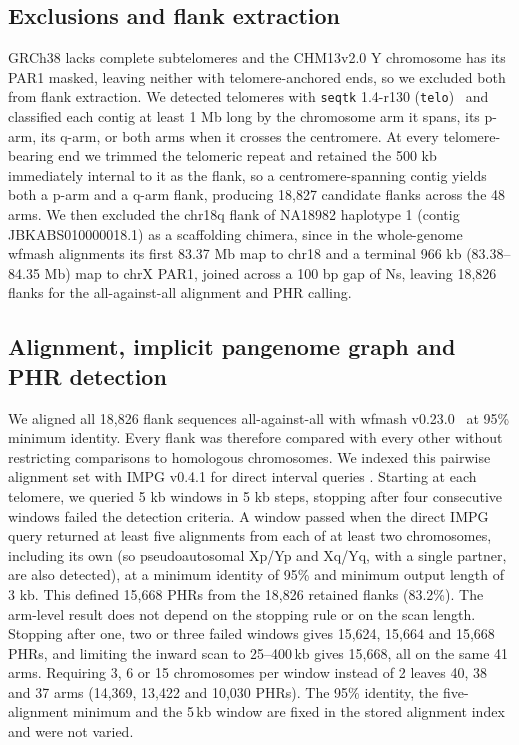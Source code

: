 \documentclass[pdflatex,mathphys]{jnl}
\begin{document}
\subsection*{Exclusions and flank extraction}

GRCh38 lacks complete subtelomeres and the CHM13v2.0 Y chromosome has its PAR1
masked, leaving neither with telomere-anchored ends, so we excluded both from
flank extraction. We detected telomeres with \texttt{seqtk} 1.4-r130
(\texttt{telo})~\cite{seqtk} and classified each contig at least 1 Mb long by the
chromosome arm it spans, its p-arm, its q-arm, or both arms when it crosses the
centromere. At every telomere-bearing end we trimmed the telomeric repeat and
retained the 500 kb immediately internal to it as the flank, so a
centromere-spanning contig yields both a p-arm and a q-arm flank, producing
18,827 candidate flanks across the 48 arms. We then excluded the chr18q flank of
NA18982 haplotype 1 (contig JBKABS010000018.1) as a scaffolding chimera, since in
the whole-genome wfmash alignments its first 83.37 Mb map to chr18 and a terminal
966 kb (83.38--84.35 Mb) map to chrX PAR1, joined across a 100 bp gap of Ns,
leaving 18,826 flanks for the all-against-all alignment and PHR calling.

\subsection*{Alignment, implicit pangenome graph and PHR detection}

We aligned all 18,826 flank sequences all-against-all with wfmash
v0.23.0~\cite{wfmash} at 95\% minimum identity. Every flank was therefore
compared with every other without restricting comparisons to homologous
chromosomes. We indexed this pairwise alignment set with IMPG v0.4.1 for direct
interval queries \cite{pangenome_graphs_impg_IMPG2023}. Starting at each
telomere, we queried 5 kb windows in 5 kb steps, stopping after four consecutive
windows failed the detection criteria. A window passed when the direct IMPG
query returned at least five alignments from each of at least two
chromosomes, including its own (so pseudoautosomal Xp/Yp and Xq/Yq, with a
single partner, are also detected), at a minimum identity of 95\% and minimum
output length of 3 kb.
This defined 15,668 PHRs from the 18,826 retained flanks (83.2\%).
The arm-level result does not depend on the stopping rule or on the scan length. Stopping after one,
two or three failed windows gives 15,624, 15,664 and 15,668 PHRs, and limiting the inward scan to
25--400\,kb gives 15,668, all on the same 41 arms. Requiring 3, 6 or 15 chromosomes per window instead
of 2 leaves 40, 38 and 37 arms (14,369, 13,422 and 10,030 PHRs). The 95\% identity, the
five-alignment minimum and the 5\,kb window are fixed in the stored alignment index and were not
varied.
\end{document}
